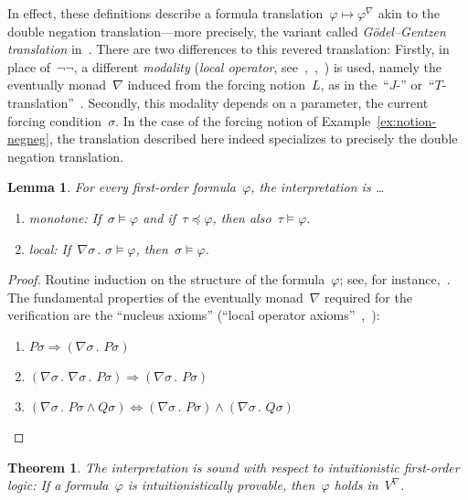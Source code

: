 \documentclass[com,11pt,crcready]{iosart2x}
\theoremstyle{definition}
\theoremstyle{plain}
\newtheorem{lemma}[definition]{Lemma}
\newtheorem{theorem}[definition]{Theorem}
\theoremstyle{remark}
\newcommand{\?}{\,{:}\,}
\newcommand{\forces}{\vDash}
\renewcommand{\_}{\mathpunct{.}\,}
\begin{document}
In effect, these definitions describe a formula translation~$\varphi \mapsto
\varphi^\nabla$ akin to the double negation translation---more precisely, the
variant called \emph{Gödel--Gentzen translation} in~\cite{ferreira-oliva:translation2,ferreira-oliva:translation}.
There are two differences to this revered translation: Firstly, in place
of~$\neg\neg$, a different \emph{modality} (\emph{local operator},
see~\cite[Section~14.5]{goldblatt:topoi},~\cite{goldblatt:modality},~\cite{pfenning-davies:reconstruction})
is used, namely the eventually monad~$\nabla$ induced from the forcing
notion~$L$, as in the~``$J$-'' or~``$T$-translation''~\cite{aczel:russell-prawitz,escardo-oliva:peirce-shift}.
Secondly, this modality depends on a parameter, the current forcing
condition~$\sigma$. In the case of the forcing notion of
Example~\ref{ex:notion-negneg}, the translation described here indeed
specializes to precisely the double negation translation.

\begin{lemma}\label{lemma:kj-basics}For every first-order formula~$\varphi$,
the interpretation is \ldots
\begin{enumerate}
\item[(a)] monotone: If~$\sigma \forces \varphi$ and if~$\tau \preceq \varphi$,
then also~$\tau \forces \varphi$.
\item[(b)] local: If~$\nabla\sigma\_ \sigma \forces \varphi$,
then~$\sigma \forces \varphi$.
\end{enumerate}
\end{lemma}

\begin{proof}Routine induction on the structure of the formula~$\varphi$; see,
for instance,~\cite[p.~98]{streicher:ctcl}. The fundamental properties of the eventually
monad~$\nabla$ required for the verification are the ``nucleus
axioms'' (``local operator
axioms''~\cite[Section~14.5]{goldblatt:topoi},~\cite{goldblatt:modality}):
\begin{enumerate}
\item $P\sigma \Rightarrow (\nabla\sigma\_P\sigma)$
\item $(\nabla\sigma\_\nabla\sigma\_P\sigma) \Rightarrow
(\nabla\sigma\_P\sigma)$
\item $(\nabla\sigma\_P\sigma\wedge Q\sigma) \Leftrightarrow
(\nabla\sigma\_P\sigma) \wedge (\nabla\sigma\_Q\sigma)$ \qedhere
\end{enumerate}
\end{proof}

\begin{theorem}\label{thm:kj-sound}The interpretation is sound with respect to
intuitionistic first-order logic: If a formula~$\varphi$ is intuitionistically
provable, then~$\varphi$ holds in~$V^\nabla$.\end{theorem}
\end{document}
